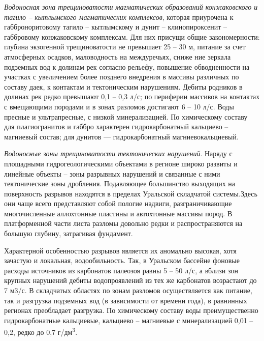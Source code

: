 \textit{Водоносная зона трещиноватости магматических образований конжаковского и тагило -- кытлымского магматических комплексов}, которая приурочена к габброноритовому тагило -- кытлымскому и дунит -- клинопироксенит -- габбровому конжаковскому комплексам. Для них присущи общие закономерности: глубина экзогенной трещиноватости не превышает 25 -- 30 м, питание за счет атмосферных осадков, маловодность на междуречьях, сниже
ние зеркала подземных вод к долинам рек согласно рельефу, повышение обводненности на участках с увеличением более позднего внедрения в массивы
различных по составу даек, к контактам и тектоническим нарушениям. Дебиты родников в долинах рек редко превышают 0,1 -- 0,3 л/с; по периферии массивов на контактах с вмещающими породами и в зонах разломов достигают 6 -- 10 л/с.
Воды пресные и ультрапресные, с низкой минерализацией. По химическому составу для плагиогранитов и габбро характерен гидрокарбонатный
кальциево -- магниевый состав; для дунитов  ---  гидрокарбонатный магниевокальциевый.

\textit{Водоносные зоны трещиноватости тектонических нарушений}. Наряду с площадными гидрогеологическими объектами в регионе широко развиты и линейные объекты  --  зоны разрывных нарушений и связанные с ними тектонические зоны дробления. Подавляющее большинство выходящих на поверхность разрывов находятся в пределах Уральской складчатой системы.Здесь они чаще всего представляют собой пологие надвиги, разграничивающие многочисленные аллохтонные пластины и автохтонные массивы пород. В платформенной части листа разломы довольно редки и распространяются
на большую глубину, затрагивая фундамент.

Характерной особенностью разрывов является их аномально высокая, хотя зачастую и локальная, водообильность. Так, в Уральском бассейне фоновые
расходы источников из карбонатов палеозоя равны 5 -- 50 л/с, а вблизи зон крупных нарушений дебиты водопроявлений из тех же карбонатов возрастают до 7 м3/с. В складчатых областях по зонам разломов осуществляется как питание, так и разгрузка подземных вод (в зависимости от времени года), в
равнинных регионах преобладает разгрузка. По химическому составу воды преимущественно гидрокарбонатные кальциевые, кальциево -- магниевые с
минерализацией 0,01 -- 0,2, редко до 0,7 г/дм\textsuperscript{3}.


